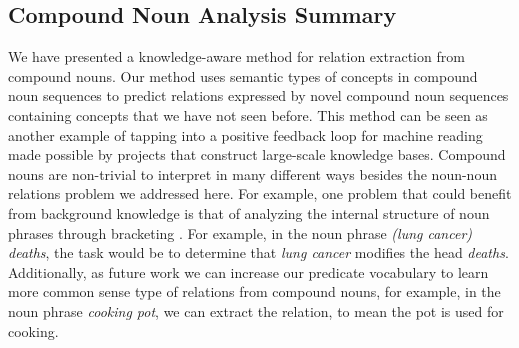 \subsection{Compound  Noun Analysis Summary}
We have presented a knowledge-aware method for relation extraction from 
compound nouns.   Our method uses semantic types of concepts in compound noun sequences
to predict relations expressed by novel compound noun sequences containing concepts that we have not seen before. This  method can be
seen as another example of tapping into a positive feedback loop for machine reading made possible by projects that construct large-scale knowledge bases. Compound nouns are non-trivial to interpret in many different ways besides the noun-noun relations problem we addressed here.  For example, one problem that could benefit from background knowledge is that of   analyzing the internal structure of noun phrases through bracketing \cite{conf/acl/VadasC07,conf/acl/VadasC08}.  For example, in the noun phrase \textit{(lung cancer) deaths},  the task would be to determine that  \textit{lung cancer} modifies the head \textit{deaths}. Additionally, as future work we can increase our predicate vocabulary to learn more common sense type of relations from compound nouns, for example, in the noun phrase \textit{cooking pot}, we can extract the relation, to mean the pot is used for cooking.
 


